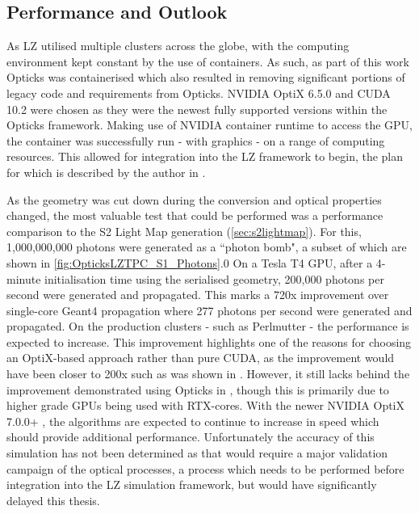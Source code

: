 \subsection{Performance and Outlook}
\par
As LZ utilised multiple clusters across the globe, with the computing environment kept constant by the use of containers.
As such, as part of this work Opticks was containerised \cite{opticks_docker_ref} which also resulted in removing significant portions of legacy code and requirements from Opticks.
NVIDIA OptiX 6.5.0 and CUDA 10.2 were chosen as they were the newest fully supported versions within the Opticks framework.
Making use of NVIDIA container runtime to access the GPU, the container was successfully run - with graphics - on a range of computing resources.
This allowed for integration into the LZ framework to begin, the plan for which is described by the author in \cite{SEriksen_Opticks_CHEP_2021_ref,lz_status_with_opticks_ref}.
\par
As the geometry was cut down during the conversion and optical properties changed, the most valuable test that could be performed was a performance comparison to the S2 Light Map generation (\autoref{sec:s2lightmap}).
For this, 1,000,000,000 photons were generated as a ``photon bomb", a subset of which are shown in \autoref{fig:OpticksLZTPC_S1_Photons}.0
On a Tesla T4 GPU, after a 4-minute initialisation time using the serialised geometry, 200,000 photons per second were generated and propagated.
This marks a 720x improvement over single-core Geant4 propagation where 277 photons per second were generated and propagated.
On the production clusters - such as Perlmutter - the performance is expected to increase.
This improvement highlights one of the reasons for choosing an OptiX-based approach rather than pure CUDA, as the improvement would have been closer to 200x such as was shown in \cite{chroma_presentation_ref}.
However, it still lacks behind the improvement demonstrated using Opticks in \cite{Opticks_CHEP_2019_ref}, though this is primarily due to higher grade GPUs being used with RTX-cores.
With the newer NVIDIA OptiX 7.0.0+ \cite{NVidiaOptiX_7_ref}, the algorithms are expected to continue to increase in speed which should provide additional performance.
Unfortunately the accuracy of this simulation has not been determined as that would require a major validation campaign of the optical processes, a process which needs to be performed before integration into the LZ simulation framework, but would have significantly delayed this thesis.


